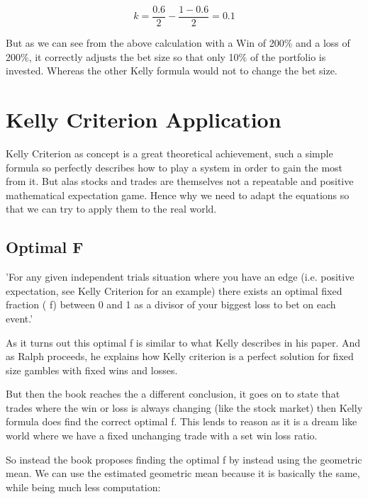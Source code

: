 \documentclass[12pt]{article}
\begin{document}
    \[k = \frac{0.6}{2} - \frac{1 - 0.6}{2} = 0.1\]

    But as we can see from the above calculation with a Win of 200\% and a loss of 200\%, it 
    correctly adjusts the bet size so that only 10\% of the portfolio is invested. Whereas the 
    other Kelly formula would not to change the bet size.

\section{Kelly Criterion Application}

    Kelly Criterion as concept is a great theoretical achievement, such a simple formula so
    perfectly describes how to play a system in order to gain the most from it. But alas
    stocks and trades are themselves not a repeatable and positive mathematical expectation
    game. Hence why we need to adapt the equations so that we can try to apply them to the
    real world.

\subsection{Optimal F}

    \begin{displayquote}
        'For any given independent trials situation where you have an edge (i.e. positive 
        expectation, see Kelly Criterion for an example) there exists an optimal fixed fraction (
        f) between 0 and 1 as a divisor of your biggest loss to bet on each event.'\cite{Ralph}
    \end{displayquote}

    As it turns out this optimal f is similar to what Kelly describes in his paper. And as Ralph 
    proceeds, he explains how Kelly criterion is a perfect solution for fixed size gambles with 
    fixed wins and losses.

    But then the book reaches the a different conclusion, it goes on to state that trades where 
    the win or loss is always changing {(like the stock market)} then Kelly formula does find the 
    correct optimal f. This lends to reason as it is a dream like world where we have a fixed 
    unchanging trade with a set win loss ratio.

    So instead the book proposes finding the optimal f by instead using the geometric mean. We 
    can use the estimated geometric mean because it is basically the same, while being much less 
    computation:
\end{document}

